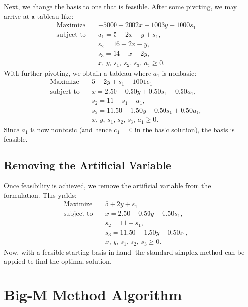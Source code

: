 Next, we change the basis to one that is feasible. After some pivoting, we may arrive at a tableau like:
\[
\begin{aligned}
\text{Maximize}\quad & -5000 + 2002x + 1003y - 1000s_1 \\
\text{subject to}\quad & a_1 = 5 - 2x - y + s_1,\\[1mm]
& s_2 = 16 - 2x - y,\\[1mm]
& s_3 = 14 - x - 2y,\\[1mm]
& x,\, y,\, s_1,\, s_2,\, s_3,\, a_1 \ge 0.
\end{aligned}
\]
With further pivoting, we obtain a tableau where \(a_1\) is nonbasic:
\[
\begin{aligned}
\text{Maximize}\quad & 5 + 2y + s_1 - 1001a_1 \\
\text{subject to}\quad & x = 2.50 - 0.50y + 0.50s_1 - 0.50a_1,\\[1mm]
& s_2 = 11 - s_1 + a_1,\\[1mm]
& s_3 = 11.50 - 1.50y - 0.50s_1 + 0.50a_1,\\[1mm]
& x,\, y,\, s_1,\, s_2,\, s_3,\, a_1 \ge 0.
\end{aligned}
\]
Since \(a_1\) is now nonbasic (and hence \(a_1=0\) in the basic solution), the basis is feasible.

\subsection*{Removing the Artificial Variable}

Once feasibility is achieved, we remove the artificial variable from the formulation. This yields:
\[
\begin{aligned}
\text{Maximize}\quad & 5 + 2y + s_1 \\
\text{subject to}\quad & x = 2.50 - 0.50y + 0.50s_1,\\[1mm]
& s_2 = 11 - s_1,\\[1mm]
& s_3 = 11.50 - 1.50y - 0.50s_1,\\[1mm]
& x,\, y,\, s_1,\, s_2,\, s_3 \ge 0.
\end{aligned}
\]
Now, with a feasible starting basis in hand, the standard simplex method can be applied to find the optimal solution.

\newpage

\section*{Big-M Method Algorithm}

